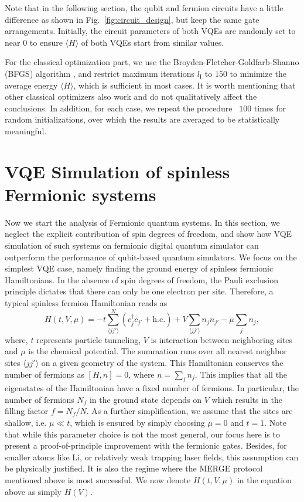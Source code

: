 \documentclass[aps, pra, reprint, superscriptaddress]{revtex4-1}
\begin{document}
Note that in the following section, the qubit and fermion circuits have a little difference as shown in Fig.~\ref{fig:circuit_design}, but keep the same gate arrangements. Initially, the circuit parameters of both VQEs are randomly set to near $0$ to ensure $\langle H \rangle$ of both VQEs start from similar values. 

For the classical optimization part, we use the Broyden-Fletcher-Goldfarb-Shanno (BFGS) algorithm \cite{broyden1970convergence,fletcher1970new,goldfarb1970family,shanno1970conditioning}, and restrict maximum iterations $l_\text{I}$ to $150$ to minimize the average energy $\langle H \rangle$, which is sufficient in most cases. It is worth mentioning that other classical optimizers also work and do not qualitatively affect the conclusions.  In addition, for each case, we repeat the procedure ~$100$ times for random initializations, over which the results are averaged to be statistically meaningful. 



\section{VQE Simulation of spinless Fermionic systems}
\label{sec:III}
Now we start the analysis of Fermionic quantum systems. In this section, we neglect the explicit contribution of spin degrees of freedom, and show how VQE simulation of such systems on fermionic digital quantum simulator can outperform 
the performance of qubit-based quantum simulators. We focus on the simplest VQE case, namely finding the ground energy of spinless fermionic Hamiltonians. In the absence of spin degrees of freedom, the Pauli exclusion principle  dictates that there can only be one electron per site. Therefore, a typical spinless fermion Hamiltonian reads as
\begin{equation}
    H(t,V,\mu)=-t\sum_{\langle jj'\rangle}^{N}(c_j^\dagger c_{j'} +\text{h.c.})+V\sum_{\langle jj'\rangle}n_jn_{j'}-\mu\sum_jn_j,
\label{eq:hubbard_spinless}
\end{equation}
where, $t$ represents particle tunneling, $V$ is interaction between neighboring sites and $\mu$ is the chemical potential. The summation runs over all nearest neighbor sites $\langle jj'\rangle$ on a given geometry of the system. 
This Hamiltonian conserves the number of fermions as $[H,n]{=}0$, where $n{=}\sum_j n_j$. 
This implies that all the eigenstates of the Hamiltonian have a fixed number of fermions. In particular, the number of fermions $N_f$ in the ground state depends on $V$ which results in the filling factor $f{=}N_f/N$. 
As a further simplification, we assume that the sites are shallow, i.e. $\mu \ll t$, which is ensured by simply choosing $\mu {=} 0$ and $t {=} 1$. Note that while this parameter choice is not the most general, our focus here is to present a proof-of-principle improvement with the fermionic gates. Besides, for smaller atoms like Li, or relatively weak trapping laser fields, this assumption can be physically justified. It is also the regime where the MERGE protocol mentioned above is most successful. We now denote $H(t,V,\mu)$ in the equation above as simply $H(V)$. 
\end{document}
